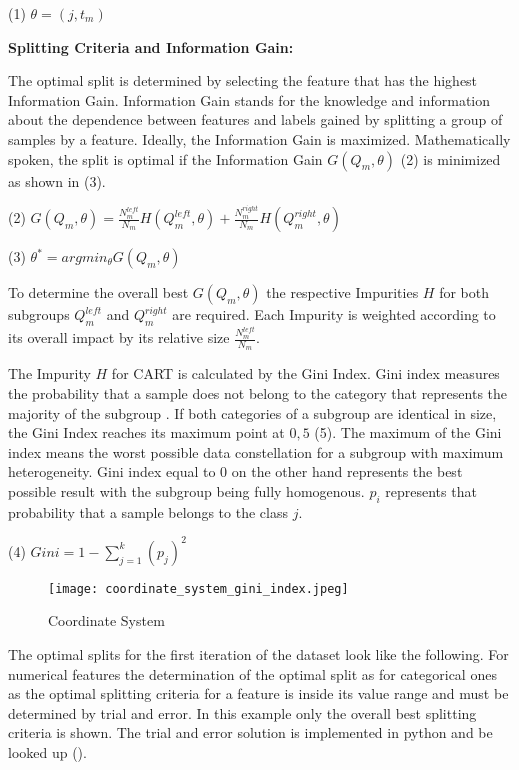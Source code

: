 (1) \(\theta = (j, t_{m})\)

\textbf{Splitting Criteria and Information Gain:}

The optimal split is determined by selecting the feature that has the highest Information Gain. Information Gain 
stands for the knowledge and information about the dependence between features and labels gained by splitting a group 
of samples by a feature. Ideally, the Information Gain is maximized. Mathematically spoken, the split is optimal if 
the Information Gain \(G(Q_{m}, \theta)\) (2) is minimized as shown in (3). 

(2) \(G(Q_{m},\theta) = \frac{N^{left}_{m}}{N_{m}} H(Q^{left}_{m}, \theta ) + \frac{N^{right}_{m}}{N_{m}} H(Q^{right}_{m}, \theta ) \)

(3) \(\theta ^* = argmin_{\theta}  G(Q_{m}, \theta)\)

To determine the overall best \(G(Q_{m}, \theta)\) the respective Impurities \(H\) for both subgroups \(Q^{left}_{m}\) 
and \(Q^{right}_{m}\) are required. Each Impurity is weighted according to its overall impact by its relative size 
\(\frac{N^{left}_{m}}{N_{m}}\).

The Impurity \(H\) for CART is calculated by the Gini Index. Gini index measures the probability that a sample 
does not belong to the category that represents the majority of the subgroup \cite[p.335]{James2021}. If both 
categories of a subgroup are identical in size, the Gini Index reaches its maximum point at \(0,5\) (5). The 
maximum of the Gini index means the worst possible data constellation for a subgroup with maximum heterogeneity. 
Gini index equal to \(0\) on the other hand represents the best possible result with the subgroup being fully 
homogenous. \(p_{i}\) represents that probability that a sample belongs to the class \(j\).

(4) \(Gini = 1 - \sum ^k_{j = 1}(p_{j})^2\)

\begin{figure}[H]
    \centering
    \caption[]{Coordinate System}
	\label{fig:coordinate_system_initial_dataset}
    \texttt{[image: coordinate\_system\_gini\_index.jpeg]}
\end{figure}

The optimal splits for the first iteration of the dataset look like the following. For numerical features the determination of 
the optimal split as for categorical ones as the optimal splitting criteria for a feature is inside its value 
range and must be determined by trial and error. In this example only the overall best splitting criteria is shown. 
The trial and error solution is implemented in python and be looked up (). 

